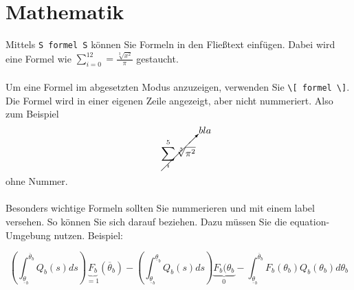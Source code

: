 \section{Mathematik}\label{sec:mathe}

Mittels \verb|S formel S| können Sie Formeln in den Fließtext einfügen. Dabei wird eine Formel wie 
$\sum_{i = 0}^{12} = \frac{\sqrt[3]{x^2}}{\pi}$ gestaucht.\\
\ \\
Um eine Formel im abgesetzten Modus anzuzeigen, verwenden Sie \verb|\[ formel \]|. Die Formel wird in einer 
eigenen Zeile angezeigt, aber nicht nummeriert. Also zum Beispiel \[ \cancelto{bla}{\sum_i^5 \sqrt[3]{\pi^2}} \] ohne Nummer.\\
\ \\
Besonders wichtige Formeln sollten Sie nummerieren und mit einem label versehen. So können Sie sich darauf beziehen. Dazu 
müssen Sie die equation-Umgebung nutzen. Beispiel:

\begin{equation}
\left( \int_{\underline{\theta}_b}^{\overline{\theta}_b} Q_b(s) ds\right) \underbrace{F_b}_{= 1} (\overline{\theta}_b) - \left( \int_{\underline{\theta}_b}^{\underline{\theta}_b} Q_b(s) ds\right) \underbrace{F_b(\theta_b}_{0} - \int_{\underline{\theta}_b}^{\overline{\theta}_b} F_b(\theta_b) Q_b(\theta_b) d\theta_b
\label{meineFormel}
\end{equation}
